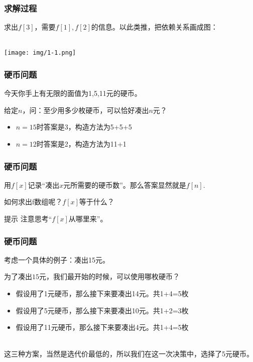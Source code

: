 \documentclass{beamer}
\begin{document}
\begin{frame}
    \frametitle{求解过程}

    求出$f[3]$，需要$f[1], f[2]$的信息。以此类推，把依赖关系画成图：

    ~\\

    \texttt{[image: img/1-1.png]}

\end{frame}

\begin{frame}
    \frametitle{硬币问题}

    今天你手上有无限的面值为1,5,11元的硬币。

    给定$n$，问：至少用多少枚硬币，可以恰好凑出$n$元？
    
    \begin{example}
        \begin{itemize}
            \item $n=15$时答案是3，构造方法为5+5+5
            \item $n=12$时答案是2，构造方法为11+1
        \end{itemize}

    \end{example}

\end{frame}

\begin{frame}
    \frametitle{硬币问题}

    用$f[x]$记录“凑出$x$元所需要的硬币数”。那么答案显然就是$f[n]$.

    如何求出f数组呢？$f[x]$等于什么？

    \begin{block}{提示}
        注意思考“$f[x]$从哪里来”。
    \end{block}

\end{frame}

\begin{frame}
    \frametitle{硬币问题}

    考虑一个具体的例子：凑出15元。

    为了凑出$15$元，我们最开始的时候，可以使用哪枚硬币？

    \begin{itemize}
        \item 假设用了1元硬币，那么接下来要凑出14元。共1+4=5枚
        \item 假设用了5元硬币，那么接下来要凑出10元。共1+2=3枚
        \item 假设用了11元硬币，那么接下来要凑出4元。共1+4=5枚
    \end{itemize}

    ~\\

    这三种方案，当然是选代价最低的，所以我们在这一次决策中，选择了5元硬币。

\end{frame}
\end{document}
